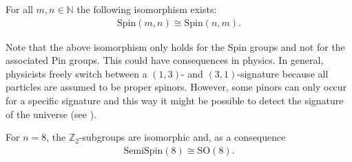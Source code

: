     \begin{property}
        For all $m,n\in\mathbb{N}$ the following isomorphism exists:
        \begin{gather}
            \mathrm{Spin}(m,n)\cong\mathrm{Spin}(n,m).
        \end{gather}
    \end{property}
    \begin{remark}
        Note that the above isomorphism only holds for the Spin groups and not for the associated Pin groups. This could have consequences in physics. In general, physicists freely switch between a $(1,3)$- and $(3,1)$-signature because all particles are assumed to be proper spinors. However, some pinors can only occur for a specific signature and this way it might be possible to detect the signature of the universe (see \cite{pin_physics}).
    \end{remark}

    \begin{property}
        For $n=8$, the $\mathbb{Z}_2$-subgroups are isomorphic and, as a consequence \begin{gather}
            \mathrm{SemiSpin}(8)\cong\mathrm{SO}(8).
        \end{gather}
    \end{property}